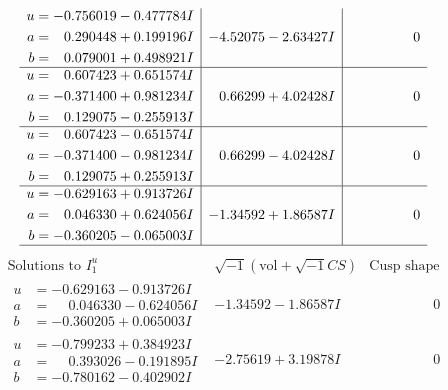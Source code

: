 \documentclass[1p]{elsarticle_modified}
\theoremstyle{definition}
\newcommand{\I}{\sqrt{-1}}
\begin{document}
$$\begin{array}{c|c|c}
\begin{aligned}
u &= -0.756019 - 0.477784 I \\
a &= \phantom{-}0.290448 + 0.199196 I \\
b &= \phantom{-}0.079001 + 0.498921 I\end{aligned}
 & -4.52075 - 2.63427 I & \phantom{-0.000000 } 0 \\ \hline\begin{aligned}
u &= \phantom{-}0.607423 + 0.651574 I \\
a &= -0.371400 + 0.981234 I \\
b &= \phantom{-}0.129075 - 0.255913 I\end{aligned}
 & \phantom{-}0.66299 + 4.02428 I & \phantom{-0.000000 } 0 \\ \hline\begin{aligned}
u &= \phantom{-}0.607423 - 0.651574 I \\
a &= -0.371400 - 0.981234 I \\
b &= \phantom{-}0.129075 + 0.255913 I\end{aligned}
 & \phantom{-}0.66299 - 4.02428 I & \phantom{-0.000000 } 0 \\ \hline\begin{aligned}
u &= -0.629163 + 0.913726 I \\
a &= \phantom{-}0.046330 + 0.624056 I \\
b &= -0.360205 - 0.065003 I\end{aligned}
 & -1.34592 + 1.86587 I & \phantom{-0.000000 } 0\\
 \hline 
 \end{array}$$\newpage$$\begin{array}{c|c|c}  
\text{Solutions to }I^u_{1}& \I (\text{vol} + \sqrt{-1}CS) & \text{Cusp shape}\\
 \hline 
\begin{aligned}
u &= -0.629163 - 0.913726 I \\
a &= \phantom{-}0.046330 - 0.624056 I \\
b &= -0.360205 + 0.065003 I\end{aligned}
 & -1.34592 - 1.86587 I & \phantom{-0.000000 } 0 \\ \hline\begin{aligned}
u &= -0.799233 + 0.384923 I \\
a &= \phantom{-}0.393026 - 0.191895 I \\
b &= -0.780162 - 0.402902 I\end{aligned}
 & -2.75619 + 3.19878 I & \phantom{-0.000000 } 0 \\ \hline\begin{aligned}

\end{aligned}
\end{array}$$
\end{document}
